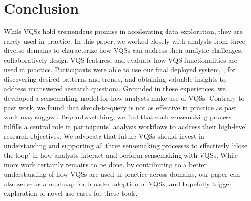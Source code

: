 \vspace{-5pt}
\section{Conclusion\label{sec:conclusion}}
While VQSs hold tremendous promise in accelerating data exploration, they are rarely used in practice. In this paper, we worked closely with analysts from three diverse domains to characterize how VQSs can address their analytic challenges, collaboratively design VQS features, and evaluate how VQS functionalities are used in practice. Participants were able to use our final deployed system, \zvpp, for discovering desired patterns and trends, and obtaining valuable insights to address unanswered research questions. Grounded in these experiences, we developed a sensemaking model for how analysts make use of VQSs. Contrary to past work, we found that sketch-to-query is not as effective in practice as past work may suggest. Beyond sketching, we find that each sensemaking process fulfills a central role in participants' analysis workflows to address their high-level research objectives. We advocate that future VQSs should invest in understanding and supporting all three sensemaking processes to effectively `close the loop' in how analysts interact and perform sensemaking with VQSs. While more work certainly remains to be done, by contributing to a better understanding of how VQSs are used in practice across domains, our paper can also serve as a roadmap for broader adoption of VQSs,
and hopefully trigger exploration of novel use cases for these tools.
